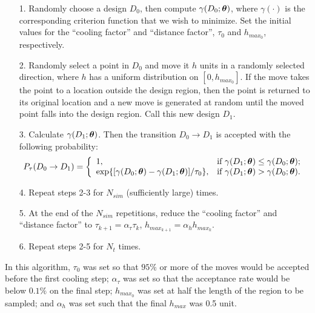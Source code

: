 \documentclass[12pt]{article}
\def\btheta{\mbox{\boldmath$\theta$}}
\begin{document}
        \begin{itemize}
            \item[1.] Randomly choose a design $D_{0}$,
            then compute $\gamma(D_{0};\btheta)$, where $\gamma(\cdot)$ is the
            corresponding criterion function that we wish to
            minimize. Set the initial values for the ``cooling
            factor''
            and ``distance factor'', $\tau_{0}$ and $h_{max_{0}}$,
            respectively.
            \item[2.] Randomly select a point in $D_{0}$ and move it $h$ units in a randomly selected direction,
            where $h$ has a uniform distribution on $[0,h_{max_{0}}]$.  If the move takes the point
            to a location outside the design region, then the point is returned to
            its original location and a new move is generated at
            random until the moved point falls into the design region. Call this new design $D_{1}$.
            \item[3.] Calculate $\gamma(D_{1};\btheta)$. Then the transition
            $D_{0} \rightarrow D_{1}$ is accepted with the following
            probability:
                $$P_{\tau}(D_{0}\rightarrow D_{1})=\left\{
                    \begin{array}{ll}
                        1, & \hbox{if $\gamma(D_{1};\btheta)\leq \gamma(D_{0};\btheta)$;} \\
                        \exp\{[\gamma(D_{0};\btheta)-\gamma(D_{1};\btheta)]/\tau_{0}\}, & \hbox{if $\gamma(D_{1};\btheta)> \gamma(D_{0};\btheta)$.}
                    \end{array}
                    \right.$$

            \item[4.] Repeat steps 2-3 for $N_{sim}$ (sufficiently large)
            times.
            \item[5.] At the end of the $N_{sim}$ repetitions, reduce
            the ``cooling factor'' and ``distance factor'' to
            $\tau_{k+1}=\alpha_{\tau}\tau_{k}$, $h_{max_{k+1}}=\alpha_{h}h_{max_{k}}$.
            \item[6.] Repeat steps 2-5 for $N_{t}$ times.
        \end{itemize}

        In this algorithm, $\tau_{0}$ was set so that $95\%$ or more
        of the moves would be accepted before the first cooling step;
        $\alpha_{\tau}$ was set so that the acceptance rate would be below $0.1\%$
        on the final step; $h_{max_{0}}$ was set
        at half the length of the region to be sampled; and $\alpha_{h}$ was set such
        that the final $h_{max}$ was 0.5 unit.
\end{document}
